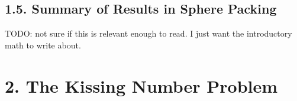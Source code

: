 \documentclass{article}
\begin{document}
\subsection*{1.5. Summary of Results in Sphere Packing}

TODO: not sure if this is relevant enough to read. I just want the introductory math to write about.

\section*{2. The Kissing Number Problem}

\end{document}
